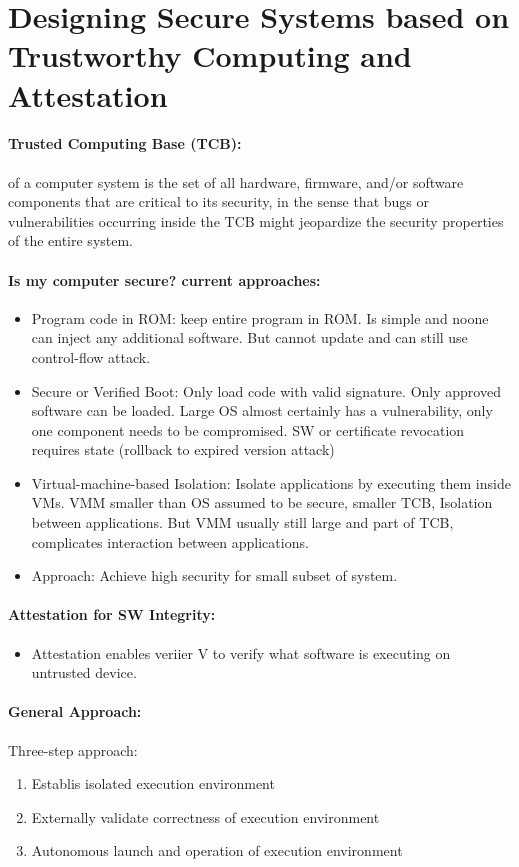 \section{Designing Secure Systems based on Trustworthy Computing and Attestation}

\paragraph{Trusted Computing Base (TCB): }
of a computer system is the set of all hardware, firmware, and/or software components that are critical to its security, in the sense that bugs or vulnerabilities occurring inside the TCB might jeopardize the security properties of the entire system.

\paragraph{Is my computer secure? current approaches: }
\begin{itemize}
    \item Program code in ROM: keep entire program in ROM. Is simple and noone can inject any additional software. But cannot update and can still use control-flow attack.
    \item Secure or Verified Boot: Only load code with valid signature. Only approved software can be loaded. Large OS almost certainly has a vulnerability, only one component needs to be compromised. SW or certificate revocation requires state (rollback to expired version attack)
    \item Virtual-machine-based Isolation: Isolate applications by executing them inside VMs. VMM smaller than OS assumed to be secure, smaller TCB, Isolation between applications. But VMM usually still large and part of TCB, complicates interaction between applications.
    \item Approach: Achieve high security for small subset of system.
\end{itemize}{}

\paragraph{Attestation for SW Integrity: }
\begin{itemize}
    \item Attestation enables veriier V to verify what software is executing on untrusted device.
\end{itemize}{}

\paragraph{General Approach: }
Three-step approach:
\begin{enumerate}
    \item Establis isolated execution environment
    \item Externally validate correctness of execution environment
    \item Autonomous launch and operation of execution environment
\end{enumerate}{}


